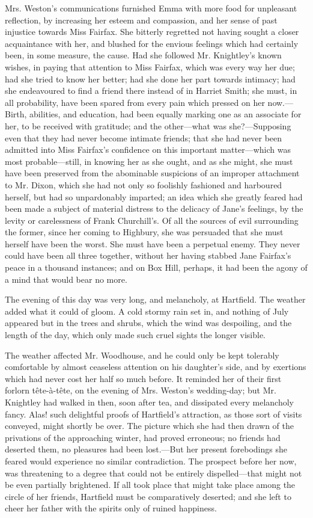 Mrs. Weston's communications furnished Emma with more food for unpleasant reflection, by increasing her esteem and compassion, and her sense of past injustice towards Miss Fairfax. She bitterly regretted not having sought a closer acquaintance with her, and blushed for the envious feelings which had certainly been, in some measure, the cause. Had she followed Mr. Knightley's known wishes, in paying that attention to Miss Fairfax, which was every way her due; had she tried to know her better; had she done her part towards intimacy; had she endeavoured to find a friend there instead of in Harriet Smith; she must, in all probability, have been spared from every pain which pressed on her now.---Birth, abilities, and education, had been equally marking one as an associate for her, to be received with gratitude; and the other---what was she?---Supposing even that they had never become intimate friends; that she had never been admitted into Miss Fairfax's confidence on this important matter---which was most probable---still, in knowing her as she ought, and as she might, she must have been preserved from the abominable suspicions of an improper attachment to Mr. Dixon, which she had not only so foolishly fashioned and harboured herself, but had so unpardonably imparted; an idea which she greatly feared had been made a subject of material distress to the delicacy of Jane's feelings, by the levity or carelessness of Frank Churchill's. Of all the sources of evil surrounding the former, since her coming to Highbury, she was persuaded that she must herself have been the worst. She must have been a perpetual enemy. They never could have been all three together, without her having stabbed Jane Fairfax's peace in a thousand instances; and on Box Hill, perhaps, it had been the agony of a mind that would bear no more.

The evening of this day was very long, and melancholy, at Hartfield. The weather added what it could of gloom. A cold stormy rain set in, and nothing of July appeared but in the trees and shrubs, which the wind was despoiling, and the length of the day, which only made such cruel sights the longer visible.

The weather affected Mr. Woodhouse, and he could only be kept tolerably comfortable by almost ceaseless attention on his daughter's side, and by exertions which had never cost her half so much before. It reminded her of their first forlorn tête-à-tête, on the evening of Mrs. Weston's wedding-day; but Mr. Knightley had walked in then, soon after tea, and dissipated every melancholy fancy. Alas! such delightful proofs of Hartfield's attraction, as those sort of visits conveyed, might shortly be over. The picture which she had then drawn of the privations of the approaching winter, had proved erroneous; no friends had deserted them, no pleasures had been lost.---But her present forebodings she feared would experience no similar contradiction. The prospect before her now, was threatening to a degree that could not be entirely dispelled---that might not be even partially brightened. If all took place that might take place among the circle of her friends, Hartfield must be comparatively deserted; and she left to cheer her father with the spirits only of ruined happiness.

